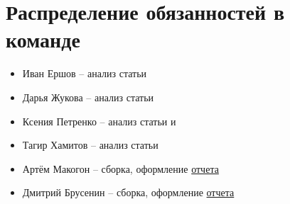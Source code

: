 
\section{Распределение обязанностей в команде}

\begin{itemize}
    \item Иван Ершов -- анализ статьи \cite{pipedream}
    \item Дарья Жукова -- анализ статьи \cite{beginning}
    \item Ксения Петренко -- анализ статьи \cite{shoeybi2019megatron} и \cite{vaswani2017attention}
    \item Тагир Хамитов -- анализ статьи \cite{DBLP}
    \item Артём Макогон -- сборка, оформление \href{https://github.com/makogon2907/HSE-Practice-Fall-2022}{отчета}
    \item Дмитрий Брусенин -- сборка, оформление \href{https://github.com/makogon2907/HSE-Practice-Fall-2022}{отчета}
\end{itemize}